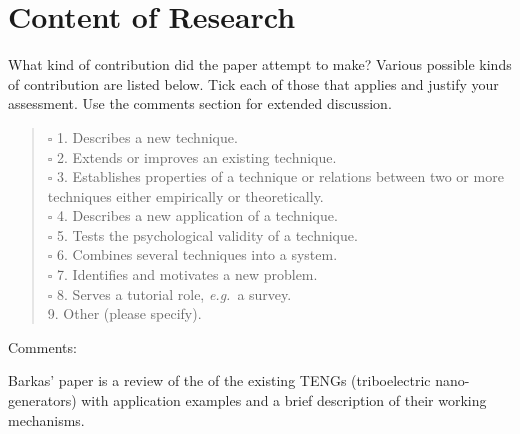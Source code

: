 \documentclass{article}
\begin{document}
\section{Content of Research}
{\small What kind of contribution did the paper attempt to make?
Various possible kinds of contribution are listed below.  Tick
each of those that applies and justify your assessment. Use the
comments section for extended discussion.}
\begin{verse}



$\square$
1. Describes a new technique.  \\
$\square$
2. Extends or improves an existing technique.  \\
$\square$
3. Establishes properties of a technique or relations between two
or more techniques either empirically or theoretically.  \\
$\square$
4. Describes a new application of a technique.  \\
$\square$
5. Tests the psychological validity of a technique.  \\
$\square$
6. Combines several techniques into a system.  \\
$\square$
7. Identifies and motivates a new problem.  \\
$\square$
8. Serves a tutorial role, {\em e.g.}~a survey.  \\
\makebox[0pt][l]{$\square$}\raisebox{.15ex}{\hspace{0.1em}$\checkmark$}
9. Other (please specify).  \\
\end{verse}
Comments:
\begin{mdframed}
Barkas' paper is a review of the of the existing TENGs (triboelectric nano-generators) with application examples and a brief description of their working mechanisms.
\end{mdframed}
\end{document}
